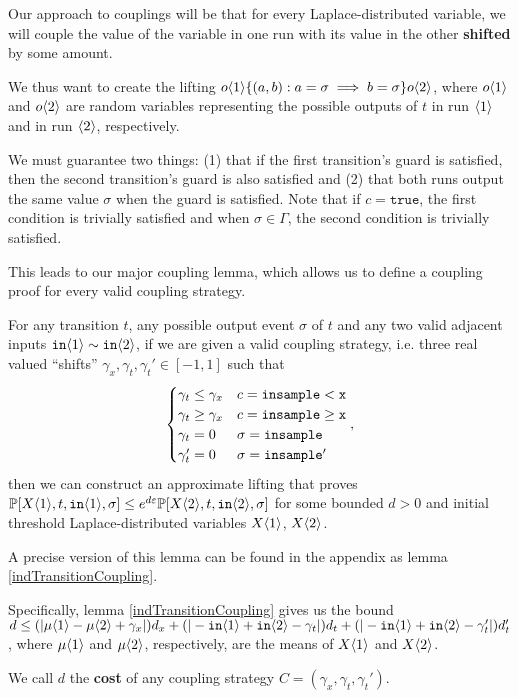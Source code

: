 Our approach to couplings will be that for every Laplace-distributed variable, we will couple the value of the variable in one run with its value in the other \textbf{shifted} by some amount. 

We thus want to create the lifting $o\brangle{1}\{(a, b): a=\sigma\implies b=\sigma\}o\brangle{2}$, where $o\brangle{1}$ and $o\brangle{2}$ are random variables representing the possible outputs of $t$ in run $\brangle{1}$ and in run $\brangle{2}$, respectively.

We must guarantee two things: (1) that if the first transition's guard is satisfied, then the second transition's guard is also satisfied and (2) that both runs output the same value $\sigma$ when the guard is satisfied. Note that if $c = \texttt{true}$, the first condition is trivially satisfied and when $\sigma\in \Gamma$, the second condition is trivially satisfied. 

This leads to our major coupling lemma, which allows us to define a coupling proof for every valid coupling strategy.

\begin{lemma}\label{simplifiedIndTransitionCoupling}
  For any transition $t$, any possible output event $\sigma$ of $t$ and any two valid adjacent inputs $\texttt{in}\brangle{1}\sim \texttt{in}\brangle{2}$, if we are given a valid coupling strategy, i.e. three real valued ``shifts'' $\gamma_x, \gamma_t, \gamma_t'\in [-1, 1]$ such that \[
    \begin{cases}
      \gamma_t\leq\gamma_x & c = \lguard[\texttt{x}]\\
      \gamma_t\geq\gamma_x & c = \gguard[\texttt{x}]\\
      \gamma_t=0 & \sigma = \texttt{insample}\\
      \gamma_t'=0 & \sigma = \texttt{insample}'
    \end{cases},
  \]
  then we can construct an approximate lifting that proves $\PP[X\brangle{1}, t, \texttt{in}\brangle{1}, \sigma]\leq e^{d\varepsilon}\PP[X\brangle{2}, t, \texttt{in}\brangle{2}, \sigma]$ for some bounded $d>0$ and initial threshold Laplace-distributed variables $X\brangle{1}$, $X\brangle{2}$.
\end{lemma}

A precise version of this lemma can be found in the appendix as lemma \ref{indTransitionCoupling}. 

Specifically, lemma \ref{indTransitionCoupling} gives us the bound $d \leq (|\mu\brangle{1}-\mu\brangle{2}+\gamma_x|)d_x+(|-\texttt{in}\brangle{1}+\texttt{in}\brangle{2}-\gamma_t|)d_t+(|-\texttt{in}\brangle{1}+\texttt{in}\brangle{2}-\gamma_t'|)d_t'$, where $\mu\brangle{1}$ and $\mu\brangle{2}$, respectively, are the means of $X\brangle{1}$ and $X\brangle{2}$.

We call $d$ the \textbf{cost} of any coupling strategy $C = (\gamma_x, \gamma_t, \gamma_t')$.
